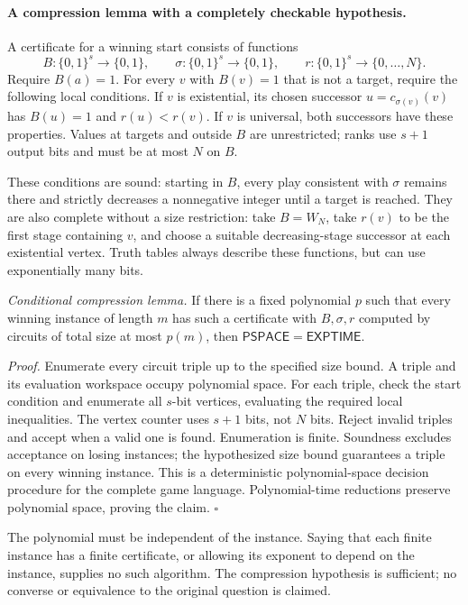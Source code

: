 \documentclass[11pt]{article}
\begin{document}
\paragraph{A compression lemma with a completely checkable hypothesis.}
A certificate for a winning start consists of functions
\[
 B:\{0,1\}^s\to\{0,1\},\qquad
 \sigma:\{0,1\}^s\to\{0,1\},\qquad
 r:\{0,1\}^s\to\{0,\ldots,N\}.
\]
Require $B(a)=1$. For every $v$ with $B(v)=1$ that is not a target, require the following local conditions. If $v$ is existential, its chosen successor $u=c_{\sigma(v)}(v)$ has $B(u)=1$ and $r(u)<r(v)$. If $v$ is universal, both successors have these properties. Values at targets and outside $B$ are unrestricted; ranks use $s+1$ output bits and must be at most $N$ on $B$.

These conditions are sound: starting in $B$, every play consistent with $\sigma$ remains there and strictly decreases a nonnegative integer until a target is reached. They are also complete without a size restriction: take $B=W_N$, take $r(v)$ to be the first stage containing $v$, and choose a suitable decreasing-stage successor at each existential vertex. Truth tables always describe these functions, but can use exponentially many bits.

\emph{Conditional compression lemma.} If there is a fixed polynomial $p$ such that every winning instance of length $m$ has such a certificate with $B,\sigma,r$ computed by circuits of total size at most $p(m)$, then $\mathsf{PSPACE}=\mathsf{EXPTIME}$.

\emph{Proof.} Enumerate every circuit triple up to the specified size bound. A triple and its evaluation workspace occupy polynomial space. For each triple, check the start condition and enumerate all $s$-bit vertices, evaluating the required local inequalities. The vertex counter uses $s+1$ bits, not $N$ bits. Reject invalid triples and accept when a valid one is found. Enumeration is finite. Soundness excludes acceptance on losing instances; the hypothesized size bound guarantees a triple on every winning instance. This is a deterministic polynomial-space decision procedure for the complete game language. Polynomial-time reductions preserve polynomial space, proving the claim. \hfill$\square$

The polynomial must be independent of the instance. Saying that each finite instance has a finite certificate, or allowing its exponent to depend on the instance, supplies no such algorithm. The compression hypothesis is sufficient; no converse or equivalence to the original question is claimed.
\end{document}
